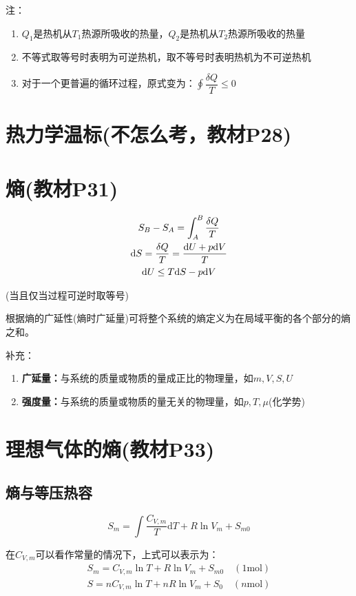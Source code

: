 \documentclass[oneside]{ctexbook}
\begin{document}
注：
\begin{enumerate}
    \item \(Q_1\)是热机从\(T_1\)热源所吸收的热量，\(Q_2\)是热机从\(T_2\)热源所吸收的热量
    \item 不等式取等号时表明为可逆热机，取不等号时表明热机为不可逆热机
    \item 对于一个更普遍的循环过程，原式变为：\(\oint\dfrac{\delta{}Q}{T}\leq0\)
\end{enumerate}

\section{热力学温标(不怎么考，教材P28)}

\section{熵(教材P31)}
\begin{gather}
    S_B-S_A=\int_A^B\dfrac{\delta{}Q}{T}\label{熵定义}\\
    \mathrm{d}S=\dfrac{\delta{}Q}{T}=\dfrac{\mathrm{d}U+p\mathrm{d}V}{T}\notag\\
    \mathrm{d}U\leq{}T\mathrm{d}S-p\mathrm{d}V\notag
\end{gather}

\begin{center}
    (当且仅当过程可逆时取等号)
\end{center}

根据熵的广延性(熵时广延量)可将整个系统的熵定义为在局域平衡的各个部分的熵之和。

补充：
\begin{enumerate}
    \item \textbf{广延量：}与系统的质量或物质的量成正比的物理量，如\(m,V,S,U\)
    \item \textbf{强度量：}与系统的质量或物质的量无关的物理量，如\(p,T,\mu\)(化学势)
\end{enumerate}

\section{理想气体的熵(教材P33)}

\subsection{熵与等压热容}
\[S_m=\int\dfrac{C_{V,m}}{T}\mathrm{d}T+R\ln{}V_m+S_{m0}\]

在\(C_{V,m}\)可以看作常量的情况下，上式可以表示为：
\begin{equation}
\begin{aligned}
    S_m=C_{V,m}\ln{}T+R\ln{}V_m+S_{m0}\quad(1\mathrm{mol})\\
    S=nC_{V,m}\ln{}T+nR\ln{}V_m+S_{0}\quad(n\mathrm{mol})
\end{aligned}
\end{equation}
\end{document}
